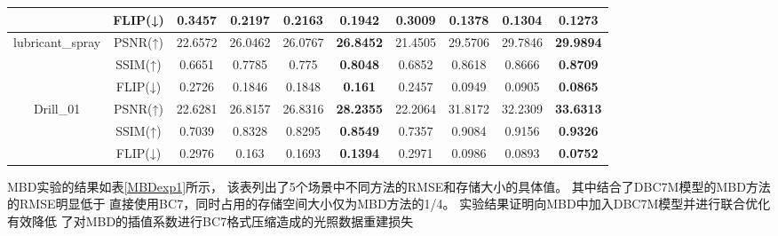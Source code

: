 \begin{table*}[htbp]
{\begin{tabular}{cccccccccc}
                                         &FLIP(↓) & 0.3457 & 0.2197 & 0.2163 & \textbf{0.1942} & 0.3009 & 0.1378 & 0.1304 & \textbf{0.1273} \\
    \midrule
    \multirow{3}{*}{lubricant\_spray}    &PSNR(↑) & 22.6572 & 26.0462 & 26.0767 & \textbf{26.8452} & 21.4505 & 29.5706 & 29.7846 & \textbf{29.9894} \\
                                         &SSIM(↑) & 0.6651 & 0.7785 & 0.775 & \textbf{0.8048} & 0.6852 & 0.8618 & 0.8666 & \textbf{0.8709} \\
                                         &FLIP(↓) & 0.2726 & 0.1846 & 0.1848 & \textbf{0.161} & 0.2457 & 0.0949 & 0.0905 & \textbf{0.0865} \\
    \midrule
    \multirow{3}{*}{Drill\_01}           &PSNR(↑) & 22.6281 & 26.8157 & 26.8316 & \textbf{28.2355} & 22.2064 & 31.8172 & 32.2309 & \textbf{33.6313} \\
                                         &SSIM(↑) & 0.7039 & 0.8328 & 0.8295 & \textbf{0.8549} & 0.7357 & 0.9084 & 0.9156 & \textbf{0.9326} \\
                                         &FLIP(↓) & 0.2976 & 0.163 & 0.1693 & \textbf{0.1394} & 0.2971 & 0.0986 & 0.0893 & \textbf{0.0752} \\
    \bottomrule
\end{tabular}

}   
\end{table*}

MBD实验的结果如表\ref{MBDexp1}所示，
该表列出了5个场景中不同方法的RMSE和存储大小的具体值。
其中结合了DBC7M模型的MBD方法的RMSE明显低于
直接使用BC7，同时占用的存储空间大小仅为MBD方法的1/4。
实验结果证明向MBD中加入DBC7M模型并进行联合优化有效降低
了对MBD的插值系数进行BC7格式压缩造成的光照数据重建损失

